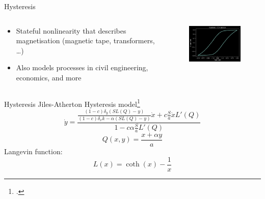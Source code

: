 \begin{frame}
\end{frame}

\begin{frame}{Hysteresis}
    \begin{columns}
        \begin{column}{0.5\linewidth}
            \begin{itemize}
                \item Stateful nonlinearity that describes magnetisation
                (magnetic tape, transformers, \dots)
                \item Also models processes in civil engineering,
                economics, and more
            \end{itemize}
        \end{column}
        \begin{column}{0.5\linewidth}
            \begin{figure}
                \centering
                \includegraphics[width=2.5in]{../Hysteresis/Pics/First_Sim}
            \end{figure}
        \end{column}
    \end{columns}
\end{frame}

\begin{frame}{Hysteresis}
    Jiles-Atherton Hysteresis model\footcite{JilesAtherton1986}
    \begin{equation}
        \dot{y} = \frac{\frac{(1-c)\delta_y(SL(Q) - y)}{(1-c)\delta_xk - \alpha(SL(Q) - y)}\dot{x} + c \frac{S}{a} \dot{x} L'(Q)}{1 - c\alpha \frac{S}{a} L'(Q)}
    \end{equation}
    \begin{equation}
        Q(x,y) = \frac{x + \alpha y}{a}
    \end{equation}
    Langevin function:
    \vspace{-2ex}
    \begin{equation}
        L(x) = \coth(x) - \frac{1}{x}
    \end{equation}
\end{frame}

